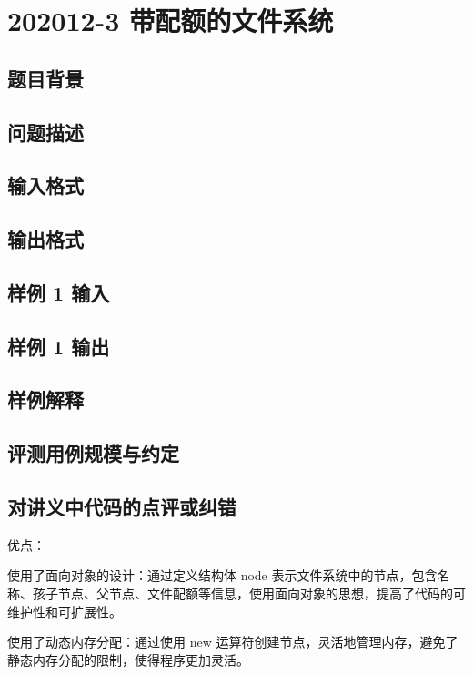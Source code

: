 \section{202012-3 带配额的文件系统}

\subsection{题目背景}

\subsection{问题描述}

\subsection{输入格式}

\subsection{输出格式}

\subsection{样例 1 输入}

\subsection{样例 1 输出}

\subsection{样例解释}

\subsection{评测用例规模与约定}

\subsection{对讲义中代码的点评或纠错}
 
优点：

使用了面向对象的设计：通过定义结构体 node 表示文件系统中的节点，包含名称、孩子节点、父节点、文件配额等信息，使用面向对象的思想，提高了代码的可维护性和可扩展性。

使用了动态内存分配：通过使用 new 运算符创建节点，灵活地管理内存，避免了静态内存分配的限制，使得程序更加灵活。


